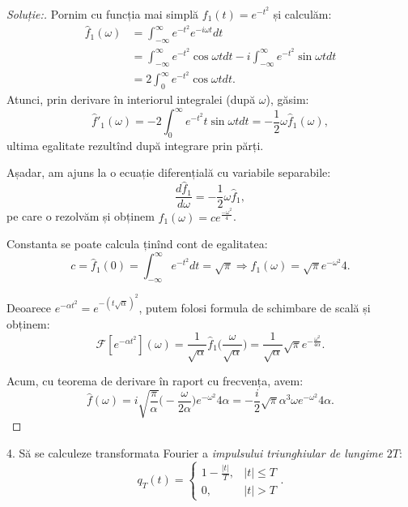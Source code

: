 \documentclass[12pt,a4paper]{article}
\newcommand\kal{\mathcal}
\theoremstyle{dotless}
\theoremstyle{dotlessdr}
\newenvironment{solution}
{\begin{proof}[Soluție:\nopunct]}
  {\end{proof}}
\begin{document}
\begin{solution}
  Pornim cu funcția mai simplă $ f_1(t) = e^{-t^2} $ și calculăm:
  \begin{align*}
    \widehat{f}_1(\omega) &= \int_{-\infty}^\infty e^{-t^2} e^{-i\omega t} dt \\
                          &= \int_{-\infty}^\infty e^{-t^2} \cos \omega t dt -
                            i \int_{-\infty}^\infty e^{-t^2} \sin \omega t dt \\
                          &= 2 \int_0^\infty e^{-t^2} \cos \omega t dt.
  \end{align*}
  Atunci, prin derivare în interiorul integralei (după $ \omega $), găsim:
  \[
    \widehat{f}'_1(\omega) = -2\int_0^\infty e^{-t^2} t \sin \omega t dt = %
    -\frac{1}{2} \omega \widehat{f}_1(\omega),
  \]
  ultima egalitate rezultînd după integrare prin părți.

  Așadar, am ajuns la o ecuație diferențială cu variabile separabile:
  \[
    \frac{d\widehat{f}_1}{d \omega} = -\frac{1}{2} \omega \widehat{f}_1,
  \]
  pe care o rezolvăm și obținem $ \widehat{f}_1(\omega) = ce^{\frac{-\omega^2}{4}} $.

  Constanta se poate calcula ținînd cont de egalitatea:
  \[
    c = \widehat{f}_1(0) = \int_{-\infty}^\infty e^{-t^2} dt = \sqrt{\pi} \Rightarrow %
    \widehat{f}_1(\omega) = \sqrt{\pi} e^{-\omega^2}{4}.
  \]

  Deoarece $ e^{-\alpha t^2} = e^{-( t \sqrt{\alpha})^2} $, putem folosi formula de
  schimbare de scală și obținem:
  \[
    \kal{F}[e^{-\alpha t^2}](\omega) = \frac{1}{\sqrt{\alpha}} %
    \widehat{f}_1\Big( \frac{\omega}{\sqrt{\alpha}} \Big) = %
    \frac{1}{\sqrt{\alpha}} \sqrt{\pi} e^{-\frac{\omega^2}{4 \alpha}}.
  \]

  Acum, cu teorema de derivare în raport cu frecvența, avem:
  \[
    \widehat{f}(\omega) = %
    i \sqrt{\frac{\pi}{\alpha}} \Big(-\frac{\omega}{2 \alpha}\Big) e^{-\omega^2}{4 \alpha} = %
    -\frac{i}{2} \sqrt{\pi}{\alpha^3} \omega e^{-\omega^2}{4 \alpha}.
  \]
\end{solution}

\vspace{1cm}

4. Să se calculeze transformata Fourier a \emph{impulsului triunghiular de lungime $ 2T $}:
\[
  q_T(t) =
  \begin{cases}
    1 - \frac{|t|}{T}, & |t| \leq T \\
    0, & |t| > T
  \end{cases}.
\]
\end{document}
